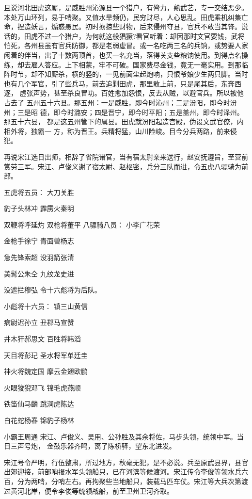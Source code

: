 且说河北田虎这厮，是威胜州沁源县一个猎户，有膂力，熟武艺，专一交结恶少。
本处万山环列，易于哨聚。又值水旱频仍，民穷财尽，人心思乱。田虎乘机纠集亡
命，捏造妖言，煽惑愚民。初时掳掠些财物，后来侵州夺县，官兵不敢当其锋。说
话的，田虎不过一个猎户，为何就这般猖獗?看官听着：却因那时文官要钱，武将
怕死，各州县虽有官兵防御，都是老弱虚冒。或一名吃两三名的兵饷，或势要人家
闲着的伴当，出了十数两顶首，也买一名充当，落得关支些粮饷使用。到得点名操
练，却去雇人答应。上下相蒙，牢不可破。国家费尽金钱，竟无一毫实用。到那临
阵时节，却不知厮杀，横的竖的，一见前面尘起炮响，只恨爷娘少生两只脚。当时
也有几个军官，引了些兵马，前去追剿田虎，那里敢上前，只是尾其后，东奔西逐，
虚张声势，甚至杀良冒功。百姓愈加怨恨，反去从贼，以避官兵。所以被他占去了
五州五十六县。那五州：一是威胜，即今时沁州；二是汾阳，即今时汾州；三是昭
德，即今时潞安；四是晋宁，即今时平阳；五是盖州，即今时泽州。那五十六县，
都是这五州管下的属县。田虎就汾阳起造宫殿，伪设文武官僚，内相外将，独霸一
方，称为晋王。兵精将猛，山川险峻。目今分兵两路，前来侵犯。

再说宋江选日出师，相辞了省院诸官，当有宿太尉亲来送行，赵安抚遵旨，至营前
赏劳三军。宋江、卢俊义谢了宿太尉、赵枢密，兵分三队而进，令五虎八骠骑为前
部。

五虎将五员：
大刀关胜

豹子头林冲
霹雳火秦明

双鞭将呼延灼
双枪将董平
八骠骑八员：
小李广花荣

金枪手徐宁
青面兽杨志

急先锋索超
没羽箭张清

美髯公朱仝
九纹龙史进

没遮拦穆弘
令十六彪将为后队。

小彪将十六员：
镇三山黄信

病尉迟孙立
丑郡马宣赞

井木犴郝思文
百胜将韩滔

天目将彭玘
圣水将军单廷圭

神火将魏定国
摩云金翅欧鹏

火眼狻猊邓飞
锦毛虎燕顺

铁笛仙马麟
跳涧虎陈达

白花蛇杨春
锦豹子杨林

小霸王周通
宋江、卢俊义、吴用、公孙胜及其余将佐，马步头领，统领中军。当日三声号炮，
金鼓乐器齐鸣，离了陈桥驿，望东北进发。

宋江号令严明，行伍整肃，所过地方，秋毫无犯，是不必说。兵至原武县界，县官
出郊迎接，前部哨报水军头领船只，已在河滨等候渡河。宋江传令李俊等领水兵六
百，分为两哨，分哨左右。再拘聚些当地船只，装载马匹车仗。宋江等大兵次第渡
过黄河北岸，便令李俊等统领战船，前至卫州卫河齐取。

